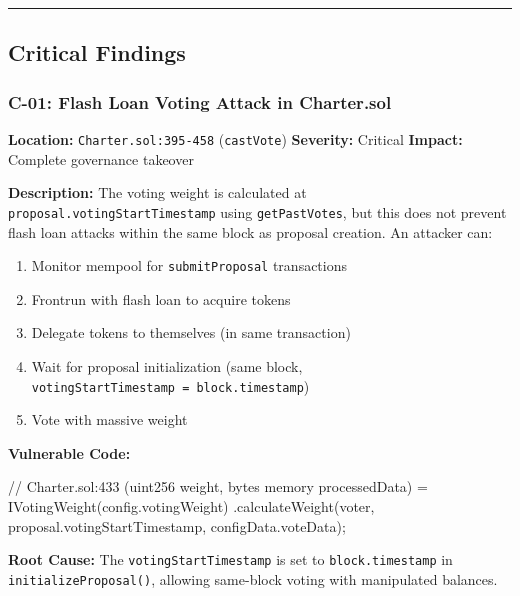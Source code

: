 \documentclass[
]{article}
\newenvironment{Shaded}{}{}
\newcommand{\NormalTok}[1]{#1}
\providecommand{\tightlist}{%
  \setlength{\itemsep}{0pt}\setlength{\parskip}{0pt}}
\begin{document}
\begin{center}\rule{0.5\linewidth}{0.5pt}\end{center}

\subsection{Critical Findings}\label{critical-findings}

\subsubsection{C-01: Flash Loan Voting Attack in
Charter.sol}\label{c-01-flash-loan-voting-attack-in-chartersol}

\textbf{Location:} \texttt{Charter.sol:395-458} (\texttt{castVote})
\textbf{Severity:} Critical \textbf{Impact:} Complete governance
takeover

\textbf{Description:} The voting weight is calculated at
\texttt{proposal.votingStartTimestamp} using \texttt{getPastVotes}, but
this does not prevent flash loan attacks within the same block as
proposal creation. An attacker can:

\begin{enumerate}
\def\labelenumi{\arabic{enumi}.}
\tightlist
\item
  Monitor mempool for \texttt{submitProposal} transactions
\item
  Frontrun with flash loan to acquire tokens
\item
  Delegate tokens to themselves (in same transaction)
\item
  Wait for proposal initialization (same block,
  \texttt{votingStartTimestamp\ =\ block.timestamp})
\item
  Vote with massive weight
\end{enumerate}

\textbf{Vulnerable Code:}

\begin{Shaded}
\begin{Highlighting}[]
\NormalTok{// Charter.sol:433}
\NormalTok{(uint256 weight, bytes memory processedData) = IVotingWeight(config.votingWeight)}
\NormalTok{    .calculateWeight(voter, proposal.votingStartTimestamp, configData.voteData);}
\end{Highlighting}
\end{Shaded}

\textbf{Root Cause:} The \texttt{votingStartTimestamp} is set to
\texttt{block.timestamp} in \texttt{initializeProposal()}, allowing
same-block voting with manipulated balances.
\end{document}
